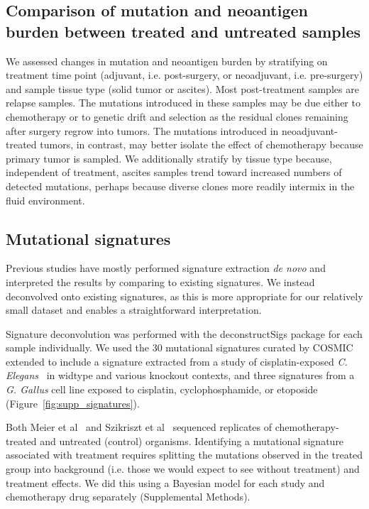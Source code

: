 \subsection*{Comparison of mutation and neoantigen burden between treated and untreated samples}
We assessed changes in mutation and neoantigen burden by stratifying on treatment time point (adjuvant, i.e. post-surgery, or neoadjuvant, i.e. pre-surgery) and sample tissue type (solid tumor or ascites). Most post-treatment samples are relapse samples. The mutations introduced in these samples may be due either to chemotherapy or to genetic drift and selection as the residual clones remaining after surgery regrow into tumors. The mutations introduced in neoadjuvant-treated tumors, in contrast, may better isolate the effect of chemotherapy because primary tumor is sampled. We additionally stratify by tissue type because, independent of treatment, ascites samples trend toward increased numbers of detected mutations, perhaps because diverse clones more readily intermix in the fluid environment.

\subsection*{Mutational signatures}
Previous studies have mostly performed signature extraction \textit{de novo} and interpreted the results by comparing to existing signatures. We instead deconvolved onto existing signatures, as this is more appropriate for our relatively small dataset and enables a straightforward interpretation.

Signature deconvolution was performed with the deconstructSigs\cite{Rosenthal_2016} package for each sample individually. We used the 30 mutational signatures curated by COSMIC~\cite{364242} extended to include a signature extracted from a study of cisplatin-exposed \textit{C. Elegans}~\cite{Meier_2014} in widtype and various knockout contexts, and three signatures from a \textit{G. Gallus} cell line exposed to cisplatin, cyclophosphamide, or etoposide~\cite{Szikriszt_2016} (Figure~\ref{fig:supp_signatures}).

Both Meier et al~\cite{Meier_2014} and Szikriszt et al~\cite{Szikriszt_2016} sequenced replicates of chemotherapy-treated and untreated (control) organisms. Identifying a mutational signature associated with treatment requires splitting the mutations observed in the treated group into background (i.e. those we would expect to see without treatment) and treatment effects. We did this using a Bayesian model for each study and chemotherapy drug separately (Supplemental Methods).

